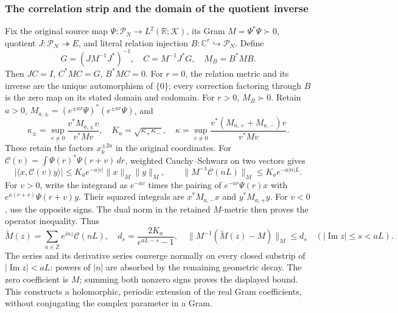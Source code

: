 \subsubsection{The correlation strip and the domain of the quotient inverse}
Fix the original source map \(\Psi:\mathcal P_N\to L^2(\mathbb R;\mathcal K)\),
its Gram \(M=\Psi^*\Psi\succ0\), quotient \(J:\mathcal P_N\twoheadrightarrow E\),
and literal relation injection \(B:\mathbb C^r\hookrightarrow\mathcal P_N\).
Define
\[
 G=(JM^{-1}J^*)^{-1},\quad C=M^{-1}J^*G,\quad M_B=B^*MB.
 \tag{HDI1}
\]
Then \(JC=I\), \(C^*MC=G\), \(B^*MC=0\). For \(r=0\), the
relation metric and its inverse are the unique automorphism of
\(\{0\}\); every correction factoring through \(B\) is the zero
map on its stated domain and codomain. For \(r>0\), \(M_B\succ0\).
Retain \(a>0\), \(M_{a,\pm}=(e^{\pm ar}\Psi)^*(e^{\pm ar}\Psi)\), and
\[
 \kappa_\pm=\sup_{v\ne0}\frac{v^*M_{a,\pm}v}{v^*Mv},\quad
 K_a=\sqrt{\kappa_+\kappa_-},\quad
 \kappa=\sup_{v\ne0}\frac{v^*(M_{a,+}+M_{a,-})v}{v^*Mv}.
 \tag{HDI2}
\]
These retain the factors \(x_k^{\pm2a}\) in the original coordinates.
For \(\mathcal C(v)=\int\Psi(r)^*\Psi(r+v)\,dr\), weighted
Cauchy--Schwarz on two vectors gives
\[
 |\langle x,\mathcal C(v)y\rangle|
 \le K_a e^{-a|v|}\|x\|_M\|y\|_M,\qquad
 \|M^{-1}\mathcal C(nL)\|_M\le K_a e^{-a|n|L}.
 \tag{HDI3}
\]
For \(v>0\), write the integrand as \(e^{-av}\) times the pairing
of \(e^{-ar}\Psi(r)x\) with \(e^{a(r+v)}\Psi(r+v)y\).
Their squared integrals are \(x^*M_{a,-}x\) and \(y^*M_{a,+}y\).
For \(v<0\), use the opposite signs. The dual norm in the retained
\(M\)-metric then proves the operator inequality.
Thus
\[
 \widetilde M(z)=\sum_{n\in\mathbb Z}e^{inz}\mathcal C(nL),\quad
 d_s=\frac{2K_a}{e^{aL-s}-1},\quad
 \|M^{-1}(\widetilde M(z)-M)\|_M\le d_s
 \quad(|\operatorname{Im}z|\le s<aL).
 \tag{HDI4}
\]
The series and its derivative series converge normally on every
closed substrip of \(|\operatorname{Im}z|<aL\): powers of \(|n|\)
are absorbed by the remaining geometric decay. The zero coefficient
is \(M\); summing both nonzero signs proves the displayed bound.
This constructs a holomorphic, periodic extension of the real Gram
coefficients, without conjugating the complex parameter in a Gram.

